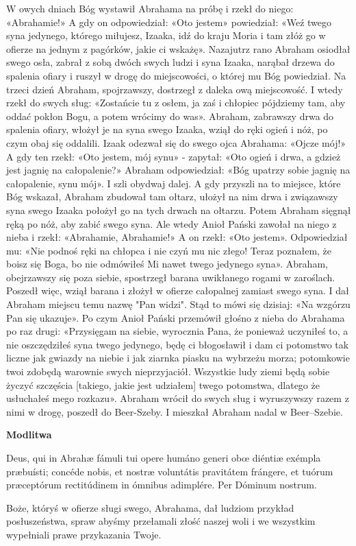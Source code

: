 \documentclass[10pt,a5paper]{book}
\newcommand{\oremus}[3]{\medskip\centerline{\textbf{#1}}\medskip
	\begin{sloppypar}
		\begin{paracol}{2}
			\setlength{\columnsep}{0em}
			\begin{leftcolumn}
				#2
			\end{leftcolumn}
			\begin{rightcolumn}
				#3
			\end{rightcolumn}
		\end{paracol}
	\end{sloppypar}}
\begin{document}
W owych dniach Bóg wystawił Abrahama na próbę i rzekł do niego: «Abrahamie!» A
gdy on odpowiedział: «Oto jestem» powiedział: «Weź twego syna jedynego, którego
miłujesz, Izaaka, idź do kraju Moria i tam złóż go w ofierze na jednym z
pagórków, jakie ci wskażę». Nazajutrz rano Abraham osiodłał swego osła, zabrał z
sobą dwóch swych ludzi i syna Izaaka, narąbał drzewa do spalenia ofiary i ruszył
w drogę do miejscowości, o której mu Bóg powiedział. Na trzeci dzień Abraham,
spojrzawszy, dostrzegł z daleka ową miejscowość. I wtedy rzekł do swych sług:
«Zostańcie tu z osłem, ja zaś i chłopiec pójdziemy tam, aby oddać pokłon Bogu, a
potem wrócimy do was». Abraham, zabrawszy drwa do spalenia ofiary, włożył je na
syna swego Izaaka, wziął do ręki ogień i nóż, po czym obaj się oddalili. Izaak
odezwał się do swego ojca Abrahama: «Ojcze mój!» A gdy ten rzekł: «Oto jestem,
mój synu» - zapytał: «Oto ogień i drwa, a gdzież jest jagnię na całopalenie?»
Abraham odpowiedział: «Bóg upatrzy sobie jagnię na całopalenie, synu mój». I
szli obydwaj dalej. A gdy przyszli na to miejsce, które Bóg wskazał, Abraham
zbudował tam ołtarz, ułożył na nim drwa i związawszy syna swego Izaaka położył
go na tych drwach na ołtarzu. Potem Abraham sięgnął ręką po nóż, aby zabić swego
syna. Ale wtedy Anioł Pański zawołał na niego z nieba i rzekł: «Abrahamie,
Abrahamie!» A on rzekł: «Oto jestem». Odpowiedział mu: «Nie podnoś ręki na
chłopca i nie czyń mu nic złego! Teraz poznałem, że boisz się Boga, bo nie
odmówiłeś Mi nawet twego jedynego syna». Abraham, obejrzawszy się poza siebie,
spostrzegł barana uwikłanego rogami w zaroślach. Poszedł więc, wziął barana i
złożył w ofierze całopalnej zamiast swego syna. I dał Abraham miejscu temu nazwę
"Pan widzi". Stąd to mówi się dzisiaj: «Na wzgórzu Pan się ukazuje». Po czym
Anioł Pański przemówił głośno z nieba do Abrahama po raz drugi: «Przysięgam na
siebie, wyrocznia Pana, że ponieważ uczyniłeś to, a nie oszczędziłeś syna twego
jedynego, będę ci błogosławił i dam ci potomstwo tak liczne jak gwiazdy na
niebie i jak ziarnka piasku na wybrzeżu morza; potomkowie twoi zdobędą warownie
swych nieprzyjaciół. Wszystkie ludy ziemi będą sobie życzyć szczęścia [takiego,
jakie jest udziałem] twego potomstwa, dlatego że usłuchałeś mego rozkazu».
Abraham wrócił do swych sług i wyruszywszy razem z nimi w drogę, poszedł do
Beer-Szeby. I mieszkał Abraham nadal w Beer--Szebie.

\oremus{Modlitwa}{Deus, qui in Abrahæ fámuli tui opere humáno generi ob\oe
	diéntiæ exémpla præbuísti; concéde nobis, et nostræ voluntátis pravitátem
	frángere, et tuórum præceptórum rectitúdinem in ómnibus adimplére. Per
	Dóminum nostrum.\\} {Boże, któryś w ofierze sługi swego, Abrahama, dał
	ludziom przykład posłuszeństwa, spraw abyśmy przełamali złość naszej woli i
	we wszystkim wypełniali prawe przykazania Twoje.}
\end{document}
